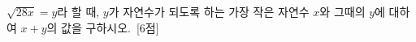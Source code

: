 $\sqrt{28x}=y$라 할 때, $y$가 자연수가 되도록 하는 가장 작은 자연수 $x$와 그때의 $y$에 대하여 $x+y$의 값을 구하시오.~\mbox{\mbox{[6점]}}
